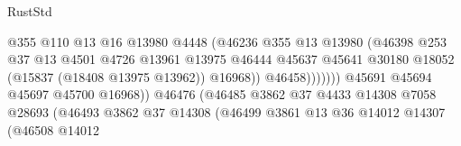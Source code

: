 \begin{lexlean}{RustStd}
\begin{coremodule}
                                                  @355
                                                  @110
                                                  @13
                                                  @16
                                                  @13980
                                                  @4448
                                                  (@46236
                                                    @355
                                                    @13
                                                    @13980
                                                    (@46398
                                                      @253
                                                      @37
                                                      @13
                                                      @4501
                                                      @4726
                                                      @13961
                                                      @13975
                                                      @46444
                                                      @45637
                                                      @45641
                                                      @30180
                                                      @18052
                                                      (@15837 (@18408 @13975 @13962))
                                                      @16968))
                                                  @46458)))))))
                                    @45691
                                    @45694
                                    @45697
                                    @45700
                                    @16968))
                                @46476
                                (@46485
                                  @3862
                                  @37
                                  @4433
                                  @14308
                                  @7058
                                  @28693
                                  (@46493
                                    @3862
                                    @37
                                    @14308
                                    (@46499
                                      @3861
                                      @13
                                      @36
                                      @14012
                                      @14307
                                      (@46508
                                        @14012

\end{coremodule}
\end{lexlean}
